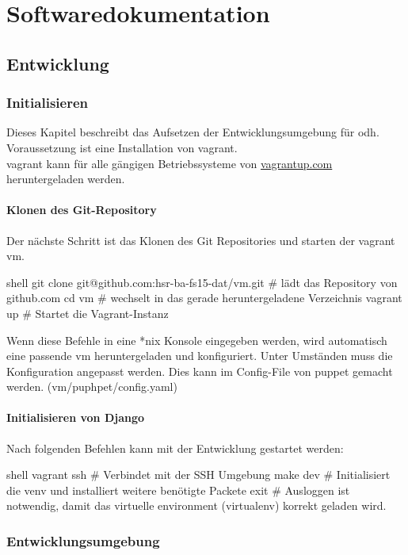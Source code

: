 \part{Softwaredokumentation}
\chapter{Entwicklung}

\section{Initialisieren}
Dieses Kapitel beschreibt das Aufsetzen der Entwicklungsumgebung für \gls{odh}. Voraussetzung ist eine Installation von \gls{vagrant}.
\\
\gls{vagrant} kann für alle gängigen Betriebssysteme von \url{vagrantup.com} heruntergeladen werden.


\subsection{Klonen des Git-Repository}
Der nächste Schritt ist das Klonen des Git Repositories und starten der \gls{vagrant} \acs{vm}.
\begin{src}{shell}
git clone git@github.com:hsr-ba-fs15-dat/vm.git  # lädt das Repository von github.com
cd vm  # wechselt in das gerade heruntergeladene Verzeichnis
vagrant up  # Startet die Vagrant-Instanz
\end{src}
Wenn diese Befehle in eine *nix Konsole eingegeben werden, wird automatisch eine passende \acs{vm} heruntergeladen und konfiguriert. Unter Umständen muss die Konfiguration angepasst werden. Dies kann im Config-File von puppet gemacht werden. (vm/puphpet/config.yaml)


\subsection{Initialisieren von Django}
Nach folgenden Befehlen kann mit der Entwicklung gestartet werden:
\begin{src}{shell}
vagrant ssh # Verbindet mit der SSH Umgebung
make dev # Initialisiert die venv und installiert weitere benötigte Packete
exit # Ausloggen ist notwendig, damit das virtuelle environment (virtualenv) korrekt geladen wird.
\end{src}
\section{Entwicklungsumgebung}
